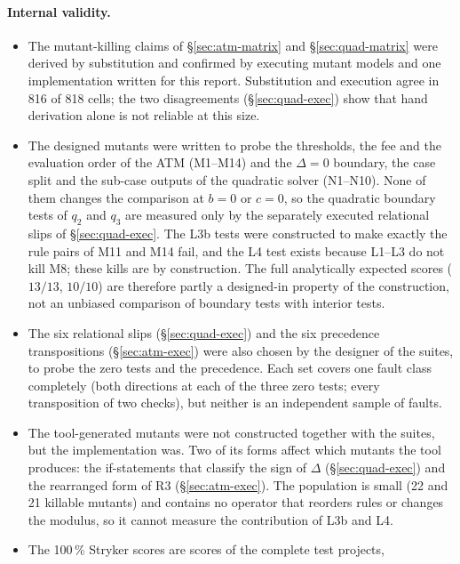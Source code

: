 \documentclass[11pt,a4paper]{article}
\begin{document}
\paragraph{Internal validity.}
\begin{itemize}
    \item The mutant-killing claims of \S\ref{sec:atm-matrix} and
    \S\ref{sec:quad-matrix} were derived by substitution and confirmed by
    executing mutant models and one implementation written for this report.
    Substitution and execution agree in 816 of 818 cells; the two
    disagreements (\S\ref{sec:quad-exec}) show that hand derivation alone is
    not reliable at this size.
    \item The designed mutants were written to probe the thresholds, the fee and the evaluation order of the ATM (M1--M14) and the \(\Delta=0\) boundary, the case split and the sub-case outputs of the quadratic solver (N1--N10). None of them changes the comparison at \(b=0\) or \(c=0\), so the quadratic boundary tests of \(q_2\) and \(q_3\) are measured only by the separately executed relational slips of \S\ref{sec:quad-exec}.
    The L3b tests were constructed to make exactly the rule pairs of M11 and
    M14 fail, and the L4 test exists because L1--L3 do not kill M8; these
    kills are by construction. The full analytically expected scores
    (\(13/13\), \(10/10\)) are therefore partly a designed-in property of the
    construction, not an unbiased comparison of boundary tests with interior
    tests.
    \item The six relational slips (\S\ref{sec:quad-exec}) and the six
    precedence transpositions (\S\ref{sec:atm-exec}) were also chosen by the
    designer of the suites, to probe the zero tests and the precedence. Each
    set covers one fault class completely (both directions at each of the
    three zero tests; every transposition of two checks), but neither is an
    independent sample of faults.
    \item The tool-generated mutants were not constructed together with the
    suites, but the implementation was. Two of its forms affect which
    mutants the tool produces: the if-statements that classify the sign of
    \(\Delta\) (\S\ref{sec:quad-exec}) and the rearranged form of R3
    (\S\ref{sec:atm-exec}). The population is small (22 and 21 killable
    mutants) and contains no operator that reorders rules or changes the
    modulus, so it cannot measure the contribution of L3b and L4.
    \item The 100\,\% Stryker scores are scores of the complete test projects,

\end{itemize}
\end{document}
